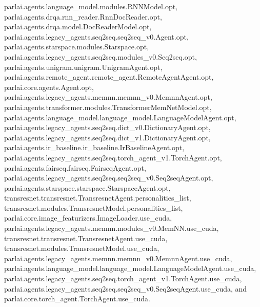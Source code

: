 parlai.\+agents.\+language\+\_\+model.\+modules.\+R\+N\+N\+Model.\+opt, parlai.\+agents.\+drqa.\+rnn\+\_\+reader.\+Rnn\+Doc\+Reader.\+opt, parlai.\+agents.\+drqa.\+model.\+Doc\+Reader\+Model.\+opt, parlai.\+agents.\+legacy\+\_\+agents.\+seq2seq.\+seq2seq\+\_\+v0.\+Agent.\+opt, parlai.\+agents.\+starspace.\+modules.\+Starspace.\+opt, parlai.\+agents.\+legacy\+\_\+agents.\+seq2seq.\+modules\+\_\+v0.\+Seq2seq.\+opt, parlai.\+agents.\+unigram.\+unigram.\+Unigram\+Agent.\+opt, parlai.\+agents.\+remote\+\_\+agent.\+remote\+\_\+agent.\+Remote\+Agent\+Agent.\+opt, parlai.\+core.\+agents.\+Agent.\+opt, parlai.\+agents.\+legacy\+\_\+agents.\+memnn.\+memnn\+\_\+v0.\+Memnn\+Agent.\+opt, parlai.\+agents.\+transformer.\+modules.\+Transformer\+Mem\+Net\+Model.\+opt, parlai.\+agents.\+language\+\_\+model.\+language\+\_\+model.\+Language\+Model\+Agent.\+opt, parlai.\+agents.\+legacy\+\_\+agents.\+seq2seq.\+dict\+\_\+v0.\+Dictionary\+Agent.\+opt, parlai.\+agents.\+legacy\+\_\+agents.\+seq2seq.\+dict\+\_\+v1.\+Dictionary\+Agent.\+opt, parlai.\+agents.\+ir\+\_\+baseline.\+ir\+\_\+baseline.\+Ir\+Baseline\+Agent.\+opt, parlai.\+agents.\+legacy\+\_\+agents.\+seq2seq.\+torch\+\_\+agent\+\_\+v1.\+Torch\+Agent.\+opt, parlai.\+agents.\+fairseq.\+fairseq.\+Fairseq\+Agent.\+opt, parlai.\+agents.\+legacy\+\_\+agents.\+seq2seq.\+seq2seq\+\_\+v0.\+Seq2seq\+Agent.\+opt, parlai.\+agents.\+starspace.\+starspace.\+Starspace\+Agent.\+opt, transresnet.\+transresnet.\+Transresnet\+Agent.\+personalities\+\_\+list, transresnet.\+modules.\+Transresnet\+Model.\+personalities\+\_\+list, parlai.\+core.\+image\+\_\+featurizers.\+Image\+Loader.\+use\+\_\+cuda, parlai.\+agents.\+legacy\+\_\+agents.\+memnn.\+modules\+\_\+v0.\+Mem\+N\+N.\+use\+\_\+cuda, transresnet.\+transresnet.\+Transresnet\+Agent.\+use\+\_\+cuda, transresnet.\+modules.\+Transresnet\+Model.\+use\+\_\+cuda, parlai.\+agents.\+legacy\+\_\+agents.\+memnn.\+memnn\+\_\+v0.\+Memnn\+Agent.\+use\+\_\+cuda, parlai.\+agents.\+language\+\_\+model.\+language\+\_\+model.\+Language\+Model\+Agent.\+use\+\_\+cuda, parlai.\+agents.\+legacy\+\_\+agents.\+seq2seq.\+torch\+\_\+agent\+\_\+v1.\+Torch\+Agent.\+use\+\_\+cuda, parlai.\+agents.\+legacy\+\_\+agents.\+seq2seq.\+seq2seq\+\_\+v0.\+Seq2seq\+Agent.\+use\+\_\+cuda, and parlai.\+core.\+torch\+\_\+agent.\+Torch\+Agent.\+use\+\_\+cuda.

